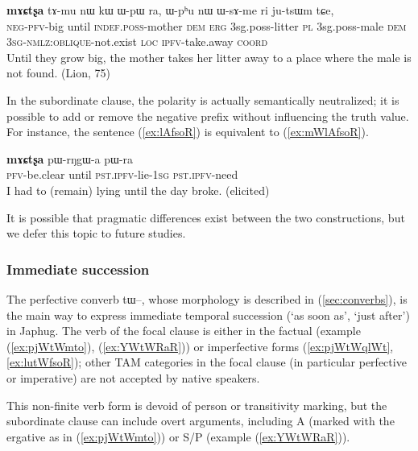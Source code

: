 \documentclass[oldfontcommands,oneside,a4paper,11pt]{article}
\newcommand{\ipa}[1]{{\phon \mbox{#1}}} %
\newcommand{\refb}[1]{(\ref{#1})}
\begin{document}
\begin{exe}
   \ex \label{ex:WsAme}
 \gll
[\ipa{mɯ-tʰɯ-wxti}]   	\textbf{\ipa{mɤɕtʂa}}  	\ipa{tɤ-mu}   	\ipa{nɯ}   	\ipa{kɯ}   	\ipa{ɯ-pɯ}   	\ipa{ra,}   	\ipa{ɯ-pʰu}   	\ipa{nɯ}   	\ipa{ɯ-sɤ-me}   	\ipa{ri}   	\ipa{ju-tsɯm}   	\ipa{tɕe,}   \\
\textsc{neg-pfv}-big until \textsc{indef.poss}-mother \textsc{dem} \textsc{erg}  {3sg.poss}-litter \textsc{pl}  {3sg.poss}-male \textsc{dem} \textsc{3sg-nmlz:oblique}-not.exist  \textsc{loc} \textsc{ipfv}-take.away \textsc{coord} \\
\glt  Until they grow big, the mother takes her litter away to a place where the male is not found. (Lion, 75)
  \end{exe}
  
In the subordinate clause, the polarity is actually semantically neutralized; it is possible to add or remove the negative prefix without influencing the truth value. For instance, the sentence \refb{ex:lAfsoR} is equivalent to \refb{ex:mWlAfsoR}.

\begin{exe}
\ex \label{ex:lAfsoR}
\gll
[\ipa{lɤ-fsoʁ}]   	\textbf{\ipa{mɤɕtʂa}}   	\ipa{pɯ-rŋgɯ-a}   	\ipa{pɯ-ra}   \\
\textsc{pfv}-be.clear until \textsc{pst.ipfv}-lie-\textsc{1sg} \textsc{pst.ipfv}-need \\
\glt I had to (remain) lying until the day broke. (elicited)
\end{exe}

It is possible that pragmatic differences exist between the two constructions, but we defer this topic to future studies.

\subsubsection{Immediate succession} \label{sec:imm.succession}


The perfective converb \ipa{tɯ--},  whose morphology is described in \refb{sec:converbs}, is the main way to express immediate temporal succession  (`as soon as', `just after') in Japhug.   The verb of the focal clause is either in the factual (example \refb{ex:pjWtWmto}, \refb{ex:YWtWRaR}) or imperfective forms (\ref{ex:pjWtWqlWt}, \ref{ex:lutWfsoR}); other TAM categories in the focal clause (in particular perfective or imperative) are not accepted by native speakers.

This non-finite verb form is devoid of person or transitivity marking, but the subordinate clause can include overt arguments, including A (marked with the ergative as in \refb{ex:pjWtWmto}) or S/P (example \refb{ex:YWtWRaR}). 
\end{document}
